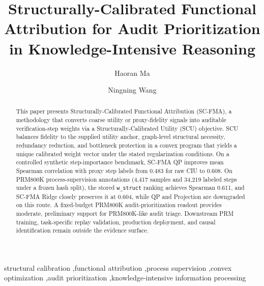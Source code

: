 \documentclass[a4paper,fleqn]{cas-sc}
\begin{document}
\let\WriteBookmarks\relax
\def\floatpagepagefraction{1}
\def\textpagefraction{.001}


\title[mode=title]{Structurally-Calibrated Functional Attribution for Audit Prioritization in Knowledge-Intensive Reasoning}

\author[1]{Haoran Ma}

\author[1,2]{Ningning Wang}




\begin{abstract}
This paper presents Structurally-Calibrated Functional Attribution (SC-FMA), a methodology that converts coarse utility or proxy-fidelity signals into auditable verification-step weights via a Structurally-Calibrated Utility (SCU) objective. SCU balances fidelity to the supplied utility anchor, graph-level structural necessity, redundancy reduction, and bottleneck protection in a convex program that yields a unique calibrated weight vector under the stated regularization conditions. On a controlled synthetic step-importance benchmark, SC-FMA QP improves mean Spearman correlation with proxy step labels from 0.483 for raw CIU to 0.608. On PRM800K process-supervision annotations (4,417 samples and 34,219 labeled steps under a frozen hash split), the stored \texttt{w\_struct} ranking achieves Spearman 0.611, and SC-FMA Ridge closely preserves it at 0.604, while QP and Projection are downgraded on this route. A fixed-budget PRM800K audit-prioritization readout provides moderate, preliminary support for PRM800K-like audit triage. Downstream PRM training, task-specific replay validation, production deployment, and causal identification remain outside the evidence surface.
\end{abstract}

\begin{keywords}
structural calibration \sep functional attribution \sep process supervision \sep convex optimization \sep audit prioritization \sep knowledge-intensive information processing
\end{keywords}
\end{document}

